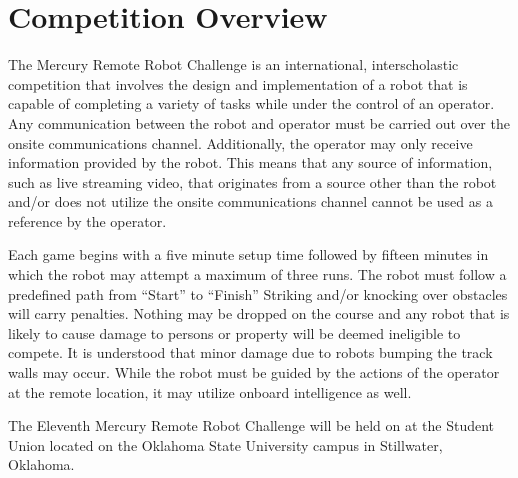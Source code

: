 \section{Competition Overview}
The Mercury Remote Robot Challenge is an international, interscholastic competition that involves the design and implementation of a robot that is capable of completing a variety of tasks while under the control of an operator. Any communication between the robot and operator must be carried out over the onsite communications channel. Additionally, the operator may only receive information provided by the robot. This means that any source of information, such as live streaming video, that originates from a source other than the robot and/or does not utilize the onsite communications channel cannot be used as a reference by the operator.

Each game begins with a five minute setup time followed by fifteen minutes in which the robot may attempt a maximum of three runs. The robot must follow a predefined path from “Start” to “Finish”  Striking and/or knocking over obstacles will carry penalties. Nothing may be dropped on the course and any robot that is likely to cause damage to persons or property will be deemed ineligible to compete. It is understood that minor damage due to robots bumping the track walls may occur. While the robot must be guided by the actions of the operator at the remote location, it may utilize onboard intelligence as well.

The Eleventh Mercury Remote Robot Challenge will be held on \textbf{\competition} at the Student Union located on the Oklahoma State University campus in Stillwater, Oklahoma.